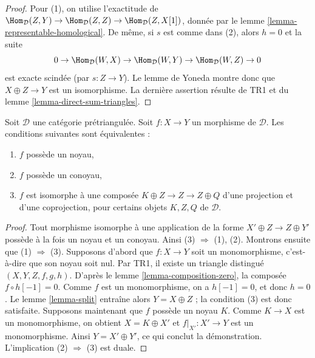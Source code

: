 \begin{proof}
Pour (1), on utilise l'exactitude de
$\Hom_\mathcal{D}(Z, Y) \to \Hom_\mathcal{D}(Z, Z) \to
\Hom_\mathcal{D}(Z, X[1])$, donnée par le
lemme \ref{lemma-representable-homological}.
De même, si $s$ est comme dans (2), alors $h = 0$ et la suite
$$
0 \to \Hom_\mathcal{D}(W, X) \to \Hom_\mathcal{D}(W, Y)
\to \Hom_\mathcal{D}(W, Z) \to 0
$$
est exacte scindée (par $s : Z \to Y$). Le lemme de Yoneda montre donc que
$X \oplus Z \to Y$ est un isomorphisme. La dernière assertion résulte de TR1
et du lemme \ref{lemma-direct-sum-triangles}.
\end{proof}

\begin{lemma}
\label{lemma-when-split}
Soit $\mathcal{D}$ une catégorie prétriangulée.
Soit $f : X \to Y$ un morphisme de $\mathcal{D}$.
Les conditions suivantes sont équivalentes :
\begin{enumerate}
\item $f$ possède un noyau,
\item $f$ possède un conoyau,
\item $f$ est isomorphe à une composée
$K \oplus Z \to Z \to Z \oplus Q$ d'une projection et d'une coprojection,
pour certains objets $K, Z, Q$ de $\mathcal{D}$.
\end{enumerate}
\end{lemma}

\begin{proof}
Tout morphisme isomorphe à une application de la forme
$X' \oplus Z \to Z \oplus Y'$ possède à la fois un noyau et un conoyau.
Ainsi (3) $\Rightarrow$ (1), (2).
Montrons ensuite que (1) $\Rightarrow$ (3).
Supposons d'abord que $f : X \to Y$ soit un monomorphisme, c'est-à-dire que son
noyau soit nul. Par TR1, il existe un triangle distingué
$(X, Y, Z, f, g, h)$. D'après le lemme \ref{lemma-composition-zero}, la composée
$f \circ h[-1] = 0$. Comme $f$ est un monomorphisme, on a $h[-1] = 0$,
et donc $h = 0$. Le lemme \ref{lemma-split} entraîne alors
$Y = X \oplus Z$ ; la condition (3) est donc satisfaite.
Supposons maintenant que $f$ possède un noyau $K$. Comme $K \to X$ est un
monomorphisme, on obtient $X = K \oplus X'$ et
$f|_{X'} : X' \to Y$ est un monomorphisme. Ainsi $Y = X' \oplus Y'$,
ce qui conclut la démonstration.
L'implication (2) $\Rightarrow$ (3) est duale.
\end{proof}

